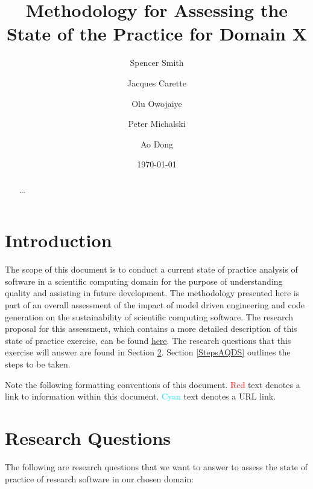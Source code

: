 \documentclass[letterpaper,cleveref]{lipics-v2019}
\title{Methodology for Assessing the State of the Practice for Domain X}
\author{Spencer Smith}{McMaster University, Canada}{smiths@mcmaster.ca}{}{}
\author{Jacques Carette}{McMaster University, Canada}{carette@mcmaster.ca}{}{}
\author{Olu Owojaiye}{McMaster University, Canada}{owojaiyo@mcmaster.ca}{}{}
\author{Peter Michalski}{McMaster University, Canada}{michap@mcmaster.ca}{}{}
\author{Ao Dong}{McMaster University, Canada}{donga9@mcmaster.ca}{}{}
\date{\today}
\theoremstyle{definition}
\begin{document}
\maketitle

\begin{abstract}
	...
\end{abstract}

\tableofcontents

\section{Introduction} \label{SecIntroduction}
The scope of this document is to conduct a current state of practice analysis of software in a scientific computing domain for the purpose of understanding quality and assisting in future development. The methodology presented here is part of an overall assessment of the impact of model driven engineering and code generation on the sustainability of scientific computing software. The research proposal for this assessment, which contains a more detailed description of this state of practice exercise, can be found \href{https://github.com/smiths/AIMSS/blob/master/OverallResearchProposal/ResearchProposal.pdf}{here}. The research questions that this exercise will answer are found in Section \ref{ResearchQuestions}. Section \ref{StepsAQDS} outlines the steps to be taken. 
 
 Note the following formatting conventions of this document. \textcolor{red}{Red} text denotes a link to information within this document. \textcolor{cyan}{Cyan} text denotes a URL link.


\section{Research Questions}\label{ResearchQuestions}

The following are research questions that we want to answer to assess the state of practice of research software in our chosen domain:
\end{document}
